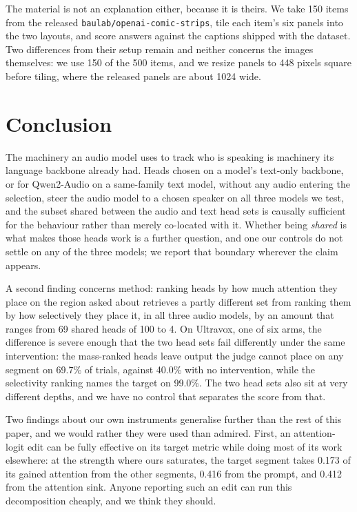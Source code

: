 \documentclass[11pt]{article}
\begin{document}
The material is not an explanation either, because it is theirs. We take 150
items from the released \texttt{baulab/openai-comic-strips}, tile each item's six
panels into the two layouts, and score answers against the captions shipped with
the dataset. Two differences from their setup remain and neither concerns the
images themselves: we use 150 of the 500 items, and we resize panels to 448
pixels square before tiling, where the released panels are about 1024 wide.

\section{Conclusion}
\label{sec:conclusion}

The machinery an audio model uses to track who is speaking is machinery its
language backbone already had. Heads chosen on a model's text-only backbone, or for Qwen2-Audio on a same-family
text model,
without any audio entering the selection, steer the audio model to a chosen
speaker on all three models we test, and the subset shared between the audio and
text head sets is causally sufficient for the behaviour rather than merely
co-located with it. Whether being \emph{shared} is what makes those heads work is
a further question, and one our controls do not settle on any of the three
models; we report that boundary wherever the claim appears.

A second finding concerns method: ranking heads by how much attention they place
on the region asked about retrieves a partly different set from ranking them by
how selectively they place it, in all three audio models, by an amount that
ranges from 69 shared heads of 100 to 4. On Ultravox, one of six arms, the difference is severe enough that the two head
sets fail differently under the same intervention: the mass-ranked heads leave
output the judge cannot place on any segment on 69.7\% of trials, against 40.0\%
with no intervention, while the selectivity ranking names the target on 99.0\%.
The two head sets also sit at very different depths, and we have no control that
separates the score from that.

Two findings about our own instruments generalise further than the rest of this
paper, and we would rather they were used than admired. First, an attention-logit
edit can be fully effective on its target metric while doing most of its work
elsewhere: at the strength where ours saturates, the target segment takes
0.173 of its gained attention from the other segments, 0.416 from the prompt, and
0.412 from the attention sink. Anyone reporting such an edit can run this
decomposition cheaply, and we think they should.
\end{document}
